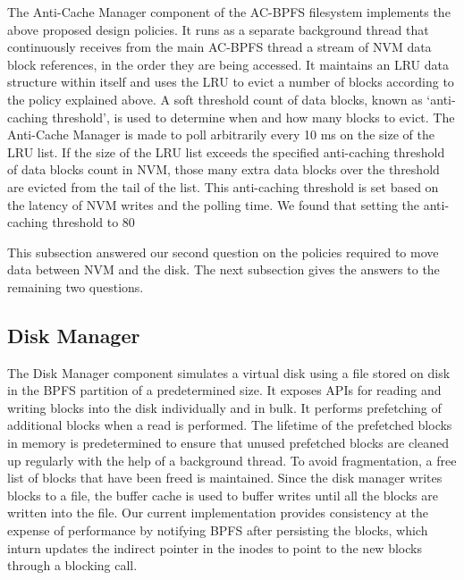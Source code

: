 The Anti-Cache Manager component of the AC-BPFS filesystem implements the above proposed design policies. It runs as a separate background thread that continuously receives from the main AC-BPFS thread a stream of NVM data block references, in the order they are being accessed. It maintains an LRU data structure within itself and uses the LRU to evict a number of blocks according to the policy explained above. A soft threshold count of data blocks, known as `anti-caching threshold', is used to determine when and how many blocks to evict. The Anti-Cache Manager is made to poll arbitrarily every 10 ms on the size of the LRU list. If the size of the LRU list exceeds the specified anti-caching threshold of data blocks count in NVM, those many extra data blocks over the threshold are evicted from the tail of the list. This anti-caching threshold is set based on the latency of NVM writes and the polling time. We found that setting the anti-caching threshold to 80%

This subsection answered our second question on the policies required to move data between NVM and the disk. The next subsection gives the answers to the remaining two questions.

\subsection{Disk Manager}
The Disk Manager component simulates a virtual disk using a file stored on disk in the BPFS partition of a predetermined size. It exposes APIs for reading and writing blocks into the disk individually and in bulk. It performs prefetching of additional blocks when a read is performed. The lifetime of the prefetched blocks in memory is predetermined to ensure that unused prefetched blocks are cleaned up regularly with the help of a background thread. To avoid fragmentation, a free list of blocks that have been freed is maintained. Since the disk manager writes blocks to a file, the buffer cache is used to buffer writes until all the blocks are written into the file. Our current implementation provides consistency at the expense of performance by notifying BPFS after persisting the blocks, which inturn updates the indirect pointer in the inodes to point to the new blocks through a blocking call.

